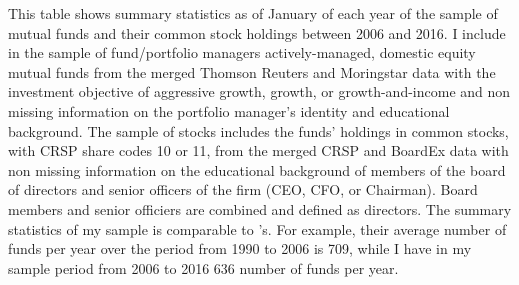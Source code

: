 \documentclass[11pt]{article}
\begin{document}
\begin{doublespace}
  This table shows summary statistics as of January of each year of the sample of mutual funds and their common stock holdings between 2006 and 2016. I include in the sample of fund/portfolio managers actively-managed, domestic equity mutual funds from the merged Thomson Reuters and Moringstar data with the investment objective of aggressive growth, growth, or growth-and-income and non missing information on the portfolio manager's identity and educational background. The sample of stocks includes the funds' holdings in common stocks, with CRSP share codes 10 or 11, from the merged CRSP and BoardEx data with non missing information on the educational background of members of the board of directors and senior officers of the firm (CEO, CFO, or Chairman). Board members and senior officiers are combined and defined as directors. The summary statistics of my sample is comparable to \cite{cohen2008small} 's. For example, their average number of funds per year over the period from 1990 to 2006 is 709, while I have in my sample period from 2006 to 2016 636 number of funds per year. 



\end{doublespace}
\end{document}
